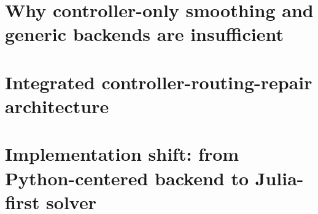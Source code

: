 \section{Why controller-only smoothing and generic backends are insufficient}
%
%

\section{Integrated controller-routing-repair architecture}
%
%

\section{Implementation shift: from Python-centered backend to Julia-first solver}
%
